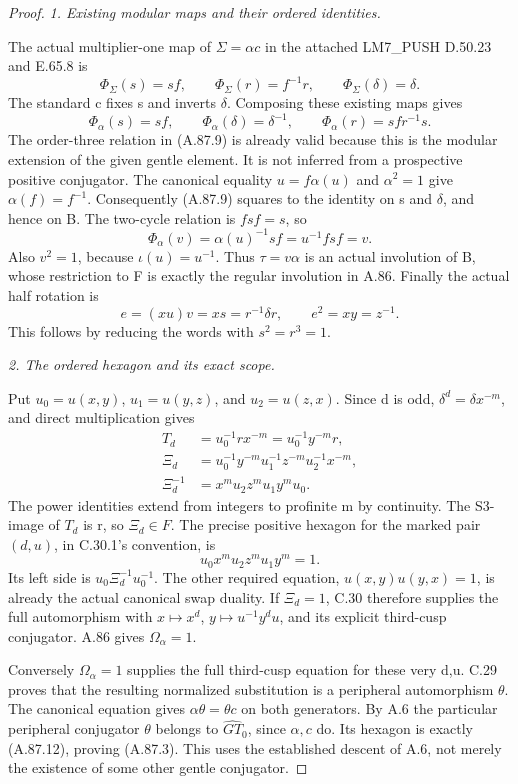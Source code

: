 \begin{proof}
\emph{1. Existing modular maps and their ordered identities.}\par
The actual multiplier-one map of \(\Sigma=\alpha c\) in the attached
LM7\_PUSH D.50.23 and E.65.8 is
\[
 \Phi_\Sigma(s)=sf,\qquad \Phi_\Sigma(r)=f^{-1}r,
 \qquad\Phi_\Sigma(\delta)=\delta.
\]
The standard c fixes s and inverts \(\delta\). Composing these existing
maps gives
\[
 \Phi_\alpha(s)=sf,\qquad
 \Phi_\alpha(\delta)=\delta^{-1},\qquad
 \Phi_\alpha(r)=sf r^{-1}s.
 \tag{A.87.9}
\]
The order-three relation in (A.87.9) is already valid because this is
the modular extension of the given gentle element. It is not inferred
from a prospective positive conjugator. The canonical equality
\(u=f\alpha(u)\) and \(\alpha^2=1\) give \(\alpha(f)=f^{-1}\).
Consequently (A.87.9) squares to the identity on s and \(\delta\),
and hence on B. The two-cycle relation is \(fsf=s\), so
\[
 \Phi_\alpha(v)=\alpha(u)^{-1}sf=u^{-1}fsf=v.
\]
Also \(v^2=1\), because \(\iota(u)=u^{-1}\). Thus \(\tau=v\alpha\)
is an actual involution of B, whose restriction to F is exactly
the regular involution in A.86. Finally the actual half rotation is
\[
 e=(xu)v=xs=r^{-1}\delta r,\qquad e^2=xy=z^{-1}.
 \tag{A.87.10}
\]
This follows by reducing the words with \(s^2=r^3=1\).

\emph{2. The ordered hexagon and its exact scope.}\par
Put \(u_0=u(x,y)\), \(u_1=u(y,z)\), and \(u_2=u(z,x)\).
Since d is odd, \(\delta^d=\delta x^{-m}\), and direct multiplication gives
\[
 \begin{aligned}
 T_d&=u_0^{-1}r x^{-m}=u_0^{-1}y^{-m}r,\\
 \Xi_d&=u_0^{-1}y^{-m}u_1^{-1}z^{-m}u_2^{-1}x^{-m},\\
 \Xi_d^{-1}&=x^m u_2z^m u_1y^m u_0.
 \end{aligned}
 \tag{A.87.11}
\]
The power identities extend from integers to profinite m by continuity.
The S3-image of \(T_d\) is r, so \(\Xi_d\in F\). The precise positive
hexagon for the marked pair \((d,u)\), in C.30.1's convention, is
\[
                         u_0x^m u_2z^m u_1y^m=1.
 \tag{A.87.12}
\]
Its left side is \(u_0\Xi_d^{-1}u_0^{-1}\). The other required equation,
\(u(x,y)u(y,x)=1\), is already the actual canonical swap duality.
If \(\Xi_d=1\), C.30 therefore supplies the full automorphism with
\(x\mapsto x^d\), \(y\mapsto u^{-1}y^d u\), and its explicit
third-cusp conjugator. A.86 gives \(\Omega_\alpha=1\).

Conversely \(\Omega_\alpha=1\) supplies the full third-cusp equation
for these very d,u. C.29 proves that the resulting normalized
substitution is a peripheral automorphism \(\theta\). The canonical
equation gives \(\alpha\theta=\theta c\) on both generators.
By A.6 the particular peripheral conjugator \(\theta\) belongs to
\(\widehat{GT}_0\), since \(\alpha,c\) do. Its hexagon is exactly
(A.87.12), proving (A.87.3). This uses the established descent of
A.6, not merely the existence of some other gentle conjugator.


\end{proof}
